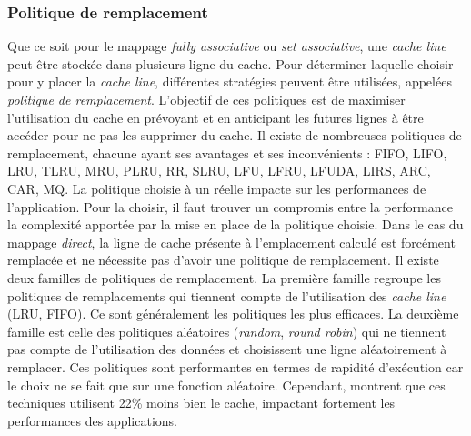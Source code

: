 



\subsubsection{Politique de remplacement}
Que ce soit pour le mappage \textit{fully associative} ou \textit{set associative}, une \textit{cache line} peut être stockée dans plusieurs ligne du cache. Pour déterminer laquelle choisir pour y placer la \textit{cache line}, différentes stratégies peuvent être utilisées, appelées \textit{politique de remplacement}. L'objectif de ces politiques est de maximiser l'utilisation du cache en prévoyant et en anticipant les futures lignes à être accéder pour ne pas les supprimer du cache. Il existe de nombreuses politiques de remplacement, chacune ayant ses avantages et ses inconvénients \cite{wikipedia2_2019}: FIFO, LIFO, LRU, TLRU, MRU, PLRU, RR, SLRU, LFU, LFRU, LFUDA, LIRS, ARC, CAR, MQ. La politique choisie à un réelle impacte sur les performances de l'application. Pour la choisir, il faut trouver un compromis entre la performance la complexité apportée par la mise en place de la politique choisie. Dans le cas du mappage \textit{direct}, la ligne de cache présente à l'emplacement calculé est forcément remplacée et ne nécessite pas d'avoir une politique de remplacement. Il existe deux familles de politiques de remplacement. La première famille regroupe les politiques de remplacements qui tiennent compte de l'utilisation des \textit{cache line} (LRU, FIFO). Ce sont généralement les politiques les plus efficaces. La deuxième famille est celle des politiques aléatoires (\textit{random}, \textit{round robin}) qui ne tiennent pas compte de l'utilisation des données et choisissent une ligne aléatoirement à remplacer. Ces politiques sont performantes en termes de rapidité d'exécution car le choix ne se fait que sur une fonction aléatoire. Cependant, \cite{Al-Zoubi:2004:PEC:986537.986601} montrent que ces techniques utilisent 22\% moins bien le cache, impactant fortement les performances des applications.


